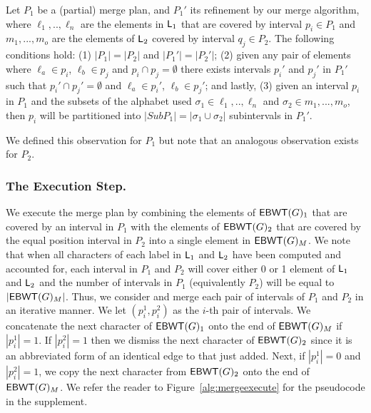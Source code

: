 \begin{observation} \label{obs} Let $P_1$ be a (partial) merge plan, and $P_1'$ its refinement by our merge algorithm, where $\ell_1,..,\ell_n$ are the elements in $\mbox{\rm {\sf L}}_1$ that are covered by interval $p_{i} \in P_1$ and $m_1,...,m_o$ are the  elements of $\mbox{\rm {\sf L}}_2$ covered by interval $q_{j} \in P_2$.  The following conditions hold:  (1) $|P_1| = |P_2|$ and $|P_1'| = |P_2'|$; (2) given any pair of
elements where $\ell_a \in p_i$, $\ell_b \in p_j$ and $p_i \cap p_j = \emptyset$ there exists intervals $p_i'$ and $p_j'$ in $P_1'$ such that  $p_i' \cap p_j' = \emptyset$ and  $\ell_a \in p_i'$, $\ell_b \in p_j'$; and lastly, (3) given an interval $p_i$ in $P_1$ and the subsets of the alphabet used $\sigma_1 \in \ell_1,..,\ell_n$ and $\sigma_2 \in m_1,...,m_o$, then $p_i$ will be partitioned into $|SubP_1| = |\sigma_1\cup\sigma_2|$ subintervals in $P_1'$.
\end{observation}

We defined this observation for $P_1$ but note that an analogous observation exists for $P_2$.








\subsubsection{The Execution Step.}

We execute the merge plan by combining the elements of $\mathsf{EBWT}(G)_1$ that are covered by an interval in $P_1$ with the elements of $\mathsf{EBWT}(G)_2$ that are covered by the equal position interval in $P_2$ into a single element in $\mathsf{EBWT}(G)_M$.  We note that when all characters of each label in $\mbox{\rm {\sf L}}_{1}$ and $\mbox{\rm {\sf L}}_{2}$ have been computed and accounted for, each interval in $P_1$ and $P_2$ will cover either 0 or 1 element of $\mbox{\rm {\sf L}}_{1}$ and $\mbox{\rm {\sf L}}_{2}$ and the number of intervals in $P_1$ (equivalently $P_2$) will be equal to $|\mathsf{EBWT}(G)_M|$. Thus, we consider and merge each pair of intervals of $P_1$ and $P_2$ in an iterative manner.  We let  $(p_i^1, p_i^2)$ as the $i$-th pair of intervals.  We concatenate the next character of $\mathsf{EBWT}(G)_1$ onto the end of $\mathsf{EBWT}(G)_M$ if $|p_i^1| = 1$.  If $|p_i^2| = 1$ then we dismiss the next character of  $\mathsf{EBWT}(G)_2$ since it is an abbreviated form of an identical edge to that just added. Next, if $|p_i^1| = 0$ and $|p_i^2| = 1$, we copy the next character from $\mathsf{EBWT}(G)_2$ onto the end of $\mathsf{EBWT}(G)_M$.  We refer the reader to Figure~\ref{alg:mergeexecute} for the pseudocode in the supplement.


